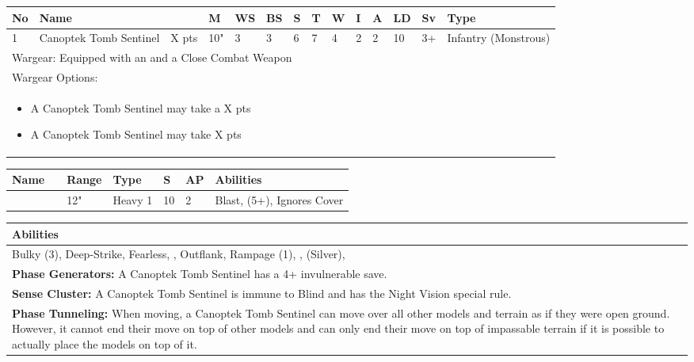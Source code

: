 \noindent
\begin{tabular}{||m{10pt} m{115pt} m{30pt} m{11pt} m{11pt} m{11pt} m{11pt} m{11pt} m{11pt} m{11pt} m{11pt} m{11pt} m{11pt} m{105pt}||}
	\hline
	No & Name & & M & WS & BS & S & T & W & I & A & LD & Sv & Type \\
	\hline
	1 & Canoptek Tomb Sentinel & X pts & 10" & 3 & 3 & 6 & 7 & 4 & 2 & 2 & 10 & 3+ & Infantry (Monstrous)\\
	\hline
	\hline
	\multicolumn{14}{||Z{532 pt}||}{Wargear: Equipped with an \quickref{Exile Cannon} and a Close Combat Weapon}\\
	\multicolumn{14}{||Z{532 pt}||}{Wargear Options:} \\	\multicolumn{14}{||Z{532 pt}||}{\begin{itemize}
			\item A Canoptek Tomb Sentinel may take a \quickref{Gloom Prism} \hrulefill X pts
			\item A Canoptek Tomb Sentinel may take \quickref{Sepulchral Scarabs} \hrulefill X pts
	\end{itemize}} \\
	\hline
\end{tabular}

\noindent
\begin{tabular}{||m{110pt} m{30pt} m{31pt} m{55pt} m{12pt} m{12pt} m{210pt}||}
	\hline
	Name & & Range & Type & S & AP & Abilities \\
	\hline
	\quickref{Exile Cannon} & & 12" & Heavy 1 & 10 & 2 & Blast, \quickref{Exile Ray} (5+), Ignores Cover \\
	\hline
\end{tabular}

\noindent
\begin{tabular}{||m{532pt}||}
	\hline
	Abilities \\
	\hline
	Bulky (3), Deep-Strike, Fearless, \quickref{Living Metal}, Outflank, Rampage (1), \quickref{Reanimation Protocols}, \quickref{Soulless Hordes} (Silver), \quickref{Tomb Guardians} \\
	\textbf{Phase Generators:} A Canoptek Tomb Sentinel has a 4+ invulnerable save. \\
	\textbf{Sense Cluster:} A Canoptek Tomb Sentinel is immune to Blind and has the Night Vision special rule. \\
	\textbf{Phase Tunneling:} When moving, a Canoptek Tomb Sentinel can move over all other models and terrain as if they were open ground. However, it cannot end their move on top of other models and can only end their move on top of impassable terrain if it is possible to actually place the models on top of it. \\
	\hline
\end{tabular}



